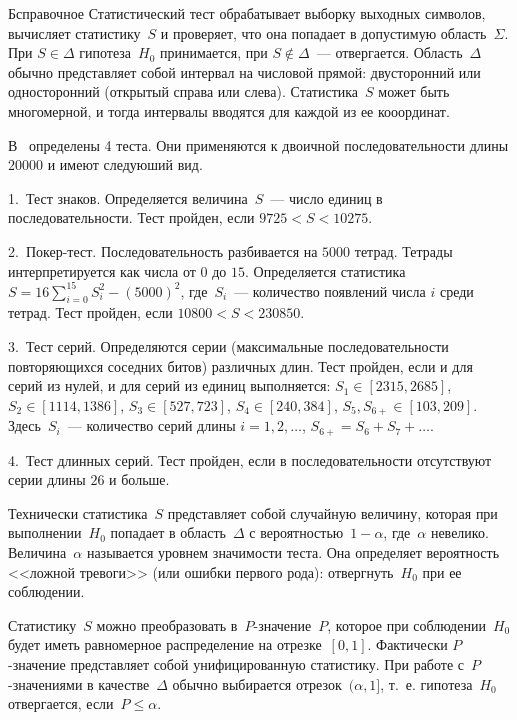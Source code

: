 \begin{appendix}{Б}{справочное}
Статистический тест обрабатывает выборку выходных символов, 
вычисляет статистику~$S$ и проверяет, что она попадает
в допустимую область~$\Sigma$. При $S\in\Delta$ гипотеза~$H_0$ принимается,
при $S\notin\Delta$~--- отвергается. Область~$\Delta$ обычно представляет
собой интервал на числовой прямой: двусторонний или односторонний 
(открытый справа или слева). Статистика~$S$ может быть многомерной,
и тогда интервалы вводятся для каждой из ее кооординат.

\begin{example}
В~\cite{FIPS140-2} определены 4 теста. Они применяются к двоичной 
последовательности длины $20000$ и имеют следуюший вид.

1.~Тест знаков. Определяется величина~$S$~--- 
число единиц в последовательности. 
Тест пройден, если $9725<S<10275$.

2.~Покер-тест. Последовательность разбивается на $5000$ тетрад.
Тетрады интерпретируется как числа от $0$ до $15$.
Определяется статистика~$S=16\sum_{i=0}^{15}S_i^2-(5000)^2$,
где~$S_i$~--- количество появлений числа $i$ среди тетрад.
Тест пройден, если $10800<S<230850$.

3.~Тест серий. Определяются серии (максимальные последовательности 
повторяющихся соседних битов) различных длин. 
Тест пройден, если и для серий из нулей, и для серий из единиц выполняется: 
$S_1\in[2315,2685]$,
$S_2\in[1114,1386]$,
$S_3\in[527,723]$,
$S_4\in[240,384]$,
$S_5,S_{6+}\in[103,209]$.
Здесь~$S_i$~--- количество серий длины $i=1,2,\ldots$, 
$S_{6+}=S_6+S_7+\ldots$.

4.~Тест длинных серий. Тест пройден, если в последовательности отсутствуют 
серии длины $26$ и больше.
\end{example}

Технически статистика~$S$ представляет собой случайную величину, 
которая при выполнении~$H_0$ попадает в область~$\Delta$ 
с вероятностью~$1-\alpha$, где~$\alpha$ невелико.
%
Величина~$\alpha$ называется уровнем значимости теста. 
%
Она определяет вероятность <<ложной тревоги>> (или ошибки первого рода): 
отвергнуть~$H_0$ при ее соблюдении.

Статистику~$S$ можно преобразовать в~$P$-значение~$P$, 
которое при соблюдении~$H_0$ будет иметь равномерное распределение на 
отрезке~$[0,1]$. Фактически $P$-значение представляет собой унифицированную 
статистику. При работе с~$P$-значениями в качестве~$\Delta$ обычно выбирается
отрезок~$(\alpha,1]$, т.~е. гипотеза~$H_0$ отвергается, если~$P\leq\alpha$.


\end{appendix}
